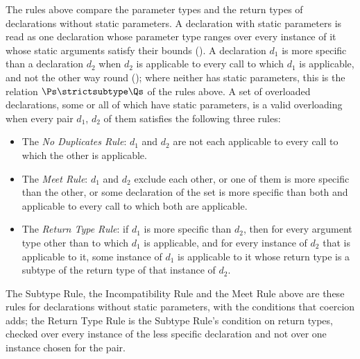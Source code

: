 The rules above compare the parameter types and the return types of
declarations without static parameters.
A declaration with static parameters is read as one declaration whose parameter
type ranges over every instance of it whose static arguments satisfy their
bounds ().
A declaration $d_1$ is more specific than a declaration $d_2$ when $d_2$ is
applicable to every call to which $d_1$ is applicable, and not the other way
round (); where neither has static parameters,
this is the relation $\Ps \strictsubtype \Qs$ of the rules above.
A set of overloaded declarations, some or all of which have static parameters,
is a valid overloading when every pair $d_1$, $d_2$ of them satisfies the
following three rules:
\begin{itemize}
\item
The \emph{No Duplicates Rule}: $d_1$ and $d_2$ are not each applicable to every
call to which the other is applicable.
\item
The \emph{Meet Rule}: $d_1$ and $d_2$ exclude each other, or one of them is more
specific than the other, or some declaration of the set is more specific than
both and applicable to every call to which both are applicable.
\item
The \emph{Return Type Rule}: if $d_1$ is more specific than $d_2$, then for
every argument type other than  to which $d_1$ is applicable,
and for every instance of $d_2$ that is applicable to it, some instance of $d_1$
is applicable to it whose return type is a subtype of the return type of that
instance of $d_2$.
\end{itemize}
The Subtype Rule, the Incompatibility Rule and the Meet Rule above are these
rules for declarations without static parameters, with the conditions that
coercion adds; the Return Type Rule is the Subtype Rule's condition on return
types, checked over every instance of the less specific declaration and not
over one instance chosen for the pair.

